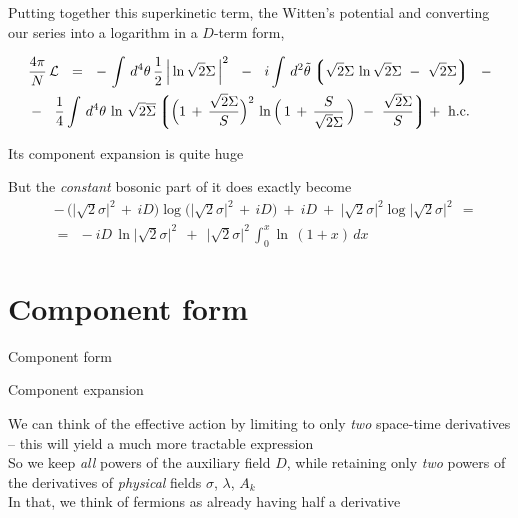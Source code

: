 \documentclass{beamer}
\begin{document}
\begin{frame}{}
	Putting together this superkinetic term, the Witten's potential
	and converting our series into a logarithm in a $ D $-term form,

\begin{align*}
%
	&
	\frac{4\pi}{N}\, \cell    ~~=~~     
			-\,
			\int\, d^4\theta\, \frac{1}{2}\, \Big| \ln \sqrt{2}\Sigma \, \Big|^2
			~~-~~
			i \int\, d^2\tilde\theta 
			\lgr
			\sqrt{2}\Sigma\, \ln \sqrt{2}\Sigma  ~-~ \sqrt{2}\Sigma
			\rgr
			~~-
	\\
%
			&
			-~~ 
			\frac{1}{4} \int\, d^4\theta\,
			\ln\, \sqrt{2}\ov\Sigma
			\lgr \Big( 1 \,+\, \frac{\sqrt{2}\Sigma}{S} \Big)^2\,
				\ln \Big(\, 1 \,+\, \frac{S}{\sqrt{2}\Sigma} \,\Big) ~-~
				\frac{\sqrt{2}\Sigma}{S} \rgr\!\!
			~+~ \text{h.c.}
\end{align*}

	Its component expansion is quite huge

	But the {\it constant} bosonic part of it does exactly become
\begin{align*}
%
	&
		-\, \big( \big|\sqrt{2}\sigma\big|^2 \,+\, iD \big) 
		\log \big( \big|\sqrt{2}\sigma\big|^2 \,+\, iD \big)
		~+~
		iD
		~+~
		\big|\sqrt{2}\sigma\big|^2 \log \big|\sqrt{2}\sigma\big|^2
		~~=
	\\
%
	& =~~
	- iD\, \ln \big|\sqrt{2}\sigma\big|^2 ~~+~~ \big|\sqrt{2}\sigma\big|^2\, \int_0^x \ln\, (1 + x)\, dx
\end{align*}

\end{frame}




\section{Component form}
\begin{frame}{}
\fontsize{60pt}{60pt}\selectfont
\begin{center}
        Component form
\end{center}
\end{frame}


\begin{frame}{Component expansion}

	We can think of the effective action by limiting to only {\it two}
	space-time derivatives -- this will yield a much more tractable expression\\[4mm]

	So we keep {\it all} powers of the auxiliary field $ D $, while
	retaining only {\it two} powers of the derivatives of {\it physical} fields
	$ \sigma $, $ \lambda $, $ A_k $\\[4mm]

	In that, we think of fermions as already having half a derivative
\end{frame}
\end{document}

